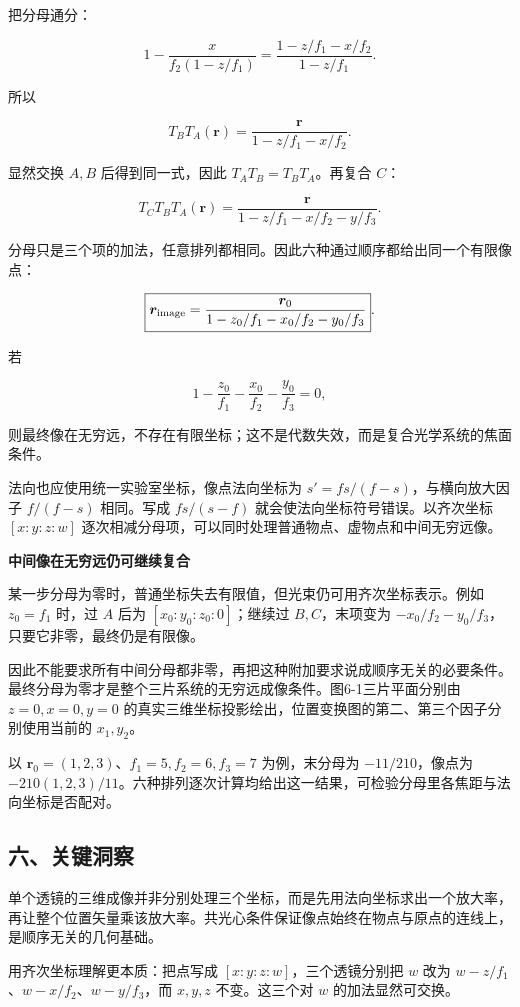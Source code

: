 \documentclass[12pt,a4paper,UTF8]{ctexart}
\begin{document}
把分母通分：

\[1-\frac{x}{f_2(1-z/f_1)}
=\frac{1-z/f_1-x/f_2}{1-z/f_1}.\]

所以

\[T_BT_A(\bm r)
=\frac{\bm r}{1-z/f_1-x/f_2}.\]

显然交换 \(A,B\) 后得到同一式，因此 \(T_AT_B=T_BT_A\)。再复合 \(C\)：

\[T_CT_BT_A(\bm r)
=\frac{\bm r}{1-z/f_1-x/f_2-y/f_3}.\]

分母只是三个项的加法，任意排列都相同。因此六种通过顺序都给出同一个有限像点：

\[\boxed{
\bm r_{\rm image}
=\frac{\bm r_0}{1-z_0/f_1-x_0/f_2-y_0/f_3}
}.\]

若

\[1-\frac{z_0}{f_1}-\frac{x_0}{f_2}-\frac{y_0}{f_3}=0,\]

则最终像在无穷远，不存在有限坐标；这不是代数失效，而是复合光学系统的焦面条件。

法向也应使用统一实验室坐标，像点法向坐标为
\(s'=fs/(f-s)\)，与横向放大因子 \(f/(f-s)\) 相同。写成 \(fs/(s-f)\)
就会使法向坐标符号错误。以齐次坐标 \([x:y:z:w]\)
逐次相减分母项，可以同时处理普通物点、虚物点和中间无穷远像。

\textbf{中间像在无穷远仍可继续复合}

某一步分母为零时，普通坐标失去有限值，但光束仍可用齐次坐标表示。例如
\(z_0=f_1\) 时，过 \(A\) 后为 \([x_0:y_0:z_0:0]\)；继续过
\(B,C\)，末项变为 \(-x_0/f_2-y_0/f_3\)，只要它非零，最终仍是有限像。

因此不能要求所有中间分母都非零，再把这种附加要求说成顺序无关的必要条件。最终分母为零才是整个三片系统的无穷远成像条件。图6-1三片平面分别由
\(z=0,x=0,y=0\)
的真实三维坐标投影绘出，位置变换图的第二、第三个因子分别使用当前的
\(x_1,y_2\)。

以 \(\bm r_0=(1,2,3)\)、\(f_1=5,f_2=6,f_3=7\) 为例，末分母为
\(-11/210\)，像点为
\(-210(1,2,3)/11\)。六种排列逐次计算均给出这一结果，可检验分母里各焦距与法向坐标是否配对。

\subsection{六、关键洞察}\label{ux516dux5173ux952eux6d1eux5bdf-5}

单个透镜的三维成像并非分别处理三个坐标，而是先用法向坐标求出一个放大率，再让整个位置矢量乘该放大率。共光心条件保证像点始终在物点与原点的连线上，是顺序无关的几何基础。

用齐次坐标理解更本质：把点写成 \([x:y:z:w]\)，三个透镜分别把 \(w\) 改为
\(w-z/f_1\)、\(w-x/f_2\)、\(w-y/f_3\)，而 \(x,y,z\) 不变。这三个对 \(w\)
的加法显然可交换。
\end{document}
